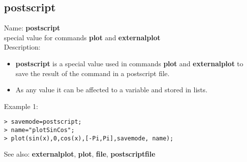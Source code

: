 \subsection{ postscript }
\noindent Name: \textbf{postscript}\\
special value for commands \textbf{plot} and \textbf{externalplot}\\

\noindent Description: \begin{itemize}

\item \textbf{postscript} is a special value used in commands \textbf{plot} and \textbf{externalplot} to save
   the result of the command in a postscript file.

\item As any value it can be affected to a variable and stored in lists.
\end{itemize}
\noindent Example 1: 
\begin{center}\begin{minipage}{15cm}\begin{Verbatim}[frame=single]
> savemode=postscript;
> name="plotSinCos";
> plot(sin(x),0,cos(x),[-Pi,Pi],savemode, name);
\end{Verbatim}
\end{minipage}\end{center}
See also: \textbf{externalplot}, \textbf{plot}, \textbf{file}, \textbf{postscriptfile}
